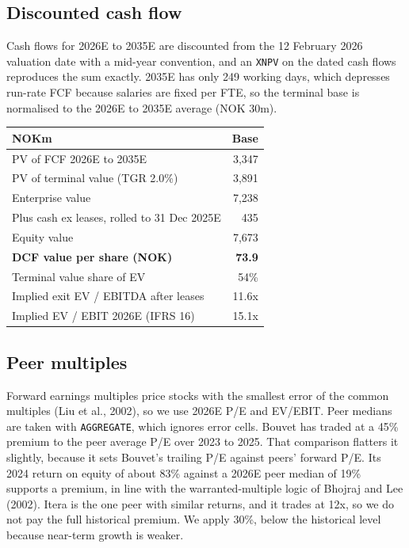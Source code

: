 \documentclass[10pt,a4paper]{article}
\begin{document}
\subsection{Discounted cash flow}
Cash flows for 2026E to 2035E are discounted from the 12 February 2026 valuation date with a mid-year convention, and an \texttt{XNPV} on the dated cash flows reproduces the sum exactly. 2035E has only 249 working days, which depresses run-rate FCF because salaries are fixed per FTE, so the terminal base is normalised to the 2026E to 2035E average (NOK 30m).

\begin{center}
\small
\begin{tabularx}{0.75\textwidth}{@{}Xr@{}}
\toprule
\textbf{NOKm} & \textbf{Base} \\
\midrule
PV of FCF 2026E to 2035E & 3,347 \\
PV of terminal value (TGR 2.0\%) & 3,891 \\
Enterprise value & 7,238 \\
Plus cash ex leases, rolled to 31 Dec 2025E & 435 \\
Equity value & 7,673 \\
\textbf{DCF value per share (NOK)} & \textbf{73.9} \\
\midrule
Terminal value share of EV & 54\% \\
Implied exit EV / EBITDA after leases & 11.6x \\
Implied EV / EBIT 2026E (IFRS 16) & 15.1x \\
\bottomrule
\end{tabularx}
\end{center}

\subsection{Peer multiples}
Forward earnings multiples price stocks with the smallest error of the common multiples (Liu et al., 2002), so we use 2026E P/E and EV/EBIT. Peer medians are taken with \texttt{AGGREGATE}, which ignores error cells. Bouvet has traded at a 45\% premium to the peer average P/E over 2023 to 2025. That comparison flatters it slightly, because it sets Bouvet's trailing P/E against peers' forward P/E. Its 2024 return on equity of about 83\% against a 2026E peer median of 19\% supports a premium, in line with the warranted-multiple logic of Bhojraj and Lee (2002). Itera is the one peer with similar returns, and it trades at 12x, so we do not pay the full historical premium. We apply 30\%, below the historical level because near-term growth is weaker.
\end{document}
